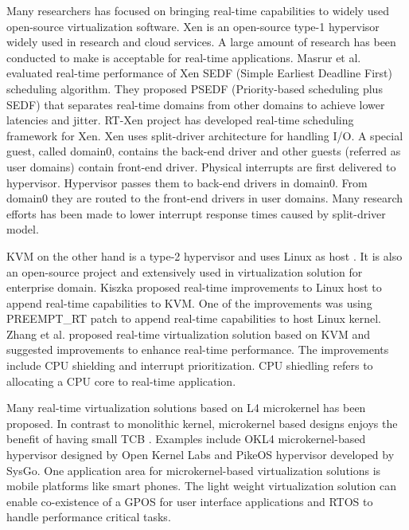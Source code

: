 Many researchers has focused on bringing real-time capabilities to widely used open-source virtualization software.
Xen \cite{Barham:2003:XAV:1165389.945462} is an open-source type-1 hypervisor widely used in research and cloud services.
A large amount of research has been conducted to make is acceptable for real-time applications.
Masrur et al. \cite{masrur2010vm} evaluated real-time performance of Xen SEDF (Simple Earliest Deadline First)
scheduling algorithm. They proposed PSEDF (Priority-based scheduling plus SEDF) that separates
real-time domains from other domains to achieve lower latencies and jitter.
RT-Xen project \cite{Xi:2011:RTR:2038642.2038651} has developed real-time scheduling framework for Xen.
Xen uses split-driver architecture for handling I/O. A special guest, called domain0, contains the
back-end driver and other guests (referred as user domains) contain front-end driver.
Physical interrupts are first delivered to hypervisor. Hypervisor passes them to back-end drivers in domain0.
From domain0 they are routed to the front-end drivers in user domains.
Many research efforts has been made to lower interrupt response times caused by split-driver model.

KVM on the other hand is a type-2 hypervisor and uses Linux as host \cite{kivity2007kvm}. 
It is also an open-source project and extensively used in virtualization solution for enterprise domain.
Kiszka \cite{kiszka2009towards} proposed real-time improvements to Linux host to append real-time capabilities to KVM.
One of the improvements was using PREEMPT\_RT patch to append real-time capabilities to host Linux kernel.
Zhang et al. \cite{zuo2010performance} proposed real-time virtualization solution based on KVM and suggested improvements to 
enhance real-time performance. The improvements include CPU shielding and interrupt prioritization. CPU shiedling
refers to allocating a CPU core to real-time application. 

Many real-time virtualization solutions based on L4 microkernel has been proposed. 
In contrast to monolithic kernel, microkernel based designs enjoys the benefit of having small TCB \cite{Heiser:2008:RVE:1435458.1435461}.
Examples include OKL4 microkernel-based hypervisor designed by Open Kernel Labs and PikeOS hypervisor developed by SysGo.
One application area for microkernel-based virtualization solutions is mobile platforms like smart phones.
The light weight virtualization solution can enable co-existence of a GPOS for user interface applications and
RTOS to handle performance critical tasks.

